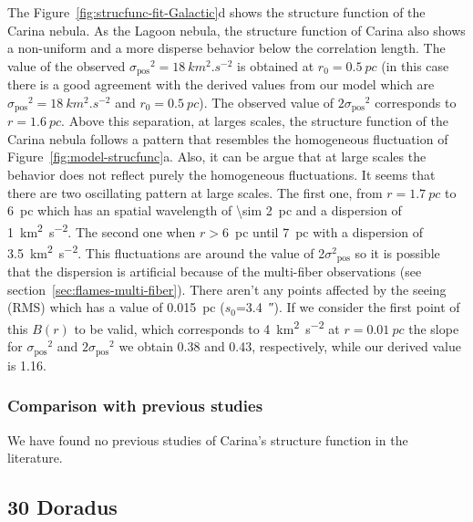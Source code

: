\documentclass[fleqn,usenatbib, useAMS, a4paper]{mnras}
\newcommand\pos{\ensuremath{_{\mathrm{pos}}}}
\begin{document}
The Figure~\ref{fig:strucfunc-fit-Galactic}d shows the structure function of the Carina nebula.
As the Lagoon nebula, the structure function of Carina also shows a non-uniform and a more disperse behavior below the correlation length.
The value of the observed \(\sigma\pos^2 = \SI{18}{km^{2}.s^{-2}}\) is obtained at \(r_0 = \SI{0.5}{pc} \) (in this case there is a good agreement with the derived values from our model which are \(\sigma\pos^2 = \SI{18}{km^{2}.s^{-2}}\) and \(r_0 = \SI{0.5}{pc} \)).
The observed value of \(2\sigma\pos^2\) corresponds to \(r = \SI{1.6}{pc} \).
Above this separation, at larges scales, the structure function of the Carina nebula follows a pattern that resembles the homogeneous fluctuation of Figure~\ref{fig:model-strucfunc}a.
Also, it can be argue that at large scales the behavior does not reflect purely the homogeneous fluctuations. 
It seems that there are two  oscillating pattern at large scales.
The first one, from \(r = \SI{1.7}{pc} \) to \SI{6}{pc} which has an spatial wavelength of \SI{\sim 2}{pc} and a dispersion of \SI{1}{km^{2}.s^{-2}}.
The second one when \(r >\)\SI{6}{pc} until \SI{7}{pc} with a dispersion of \SI{3.5}{km^{2}.s^{-2}}.
This fluctuations are around the value of 2\(\sigma^2\pos\) so it is possible that the dispersion is artificial because of the multi-fiber observations (see section~\ref{sec:flames-multi-fiber}).
There aren't any points affected by the seeing (RMS) which has a value of \SI{0.015}{pc} (\(s_0\)=\SI{3.4}{\arcsecond}).
If we consider the first point of this \(B(r)\) to be valid, which corresponds to \SI{4}{km^{2}.s^{-2}} at \(r = \SI{0.01}{pc} \) the slope for \(\sigma\pos^2\) and \(2\sigma\pos^2\) we obtain \num{0.38} and \num{0.43}, respectively, while our derived value is \num{1.16}.



\subsubsection{Comparison with previous studies}
\label{sec:comparison-carina}

We have found no previous studies of Carina's structure function in the literature.

\subsection{30 Doradus}
\label{sec:30-doradus}
\end{document}
